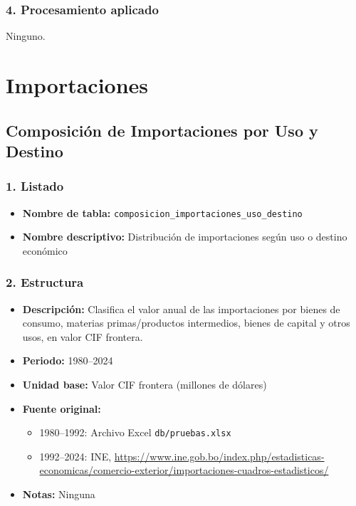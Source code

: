 \documentclass[12pt,a4paper]{article}
\begin{document}
\subsubsection*{4. Procesamiento aplicado}
Ninguno.

\newpage
\section{Importaciones}

\subsection{Composición de Importaciones por Uso y Destino}

\subsubsection*{1. Listado}
\begin{itemize}
  \item \textbf{Nombre de tabla:} \texttt{composicion\_importaciones\_uso\_destino}
  \item \textbf{Nombre descriptivo:} Distribución de importaciones según uso o destino económico
\end{itemize}

\subsubsection*{2. Estructura}
\begin{itemize}
  \item \textbf{Descripción:} Clasifica el valor anual de las importaciones por bienes de consumo, materias primas/productos intermedios, bienes de capital y otros usos, en valor CIF frontera.
  \item \textbf{Periodo:} 1980--2024
  \item \textbf{Unidad base:} Valor CIF frontera (millones de dólares)
  \item \textbf{Fuente original:}
    \begin{itemize}
      \item 1980--1992: Archivo Excel \texttt{db/pruebas.xlsx}
      \item 1992--2024: INE, \url{https://www.ine.gob.bo/index.php/estadisticas-economicas/comercio-exterior/importaciones-cuadros-estadisticos/}
    \end{itemize}
  \item \textbf{Notas:} Ninguna
\end{itemize}
\end{document}
